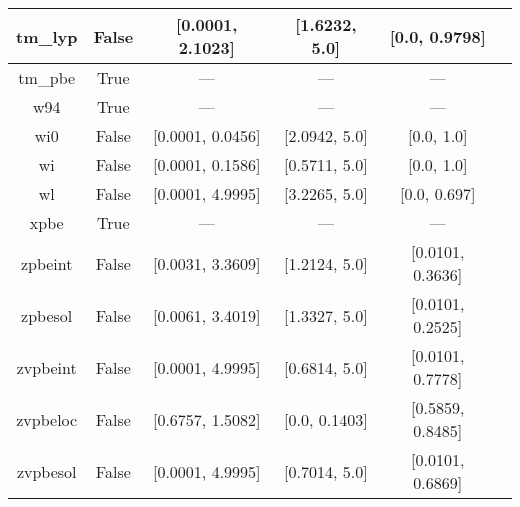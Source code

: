 \begin{tabular}{|c|c|c|c|c|l|}
       tm\_lyp &                 False & [0.0001, 2.1023] &    [1.6232, 5.0] &    [0.0, 0.9798] &                                      \cite{Thakkar2009_134109} \\ \hline
       tm\_pbe &                  True &              --- &              --- &              --- &                                      \cite{Thakkar2009_134109} \\ \hline
           w94 &                  True &              --- &              --- &              --- &                                          \cite{Wilson1994_337} \\ \hline
           wi0 &                 False & [0.0001, 0.0456] &    [2.0942, 5.0] &       [0.0, 1.0] &                                          \cite{Wilson1998_523} \\ \hline
            wi &                 False & [0.0001, 0.1586] &    [0.5711, 5.0] &       [0.0, 1.0] &                                          \cite{Wilson1998_523} \\ \hline
            wl &                 False & [0.0001, 4.9995] &    [3.2265, 5.0] &     [0.0, 0.697] &                                        \cite{Wilson1990_12930} \\ \hline
          xpbe &                  True &              --- &              --- &              --- &                                             \cite{Xu2004_4068} \\ \hline
       zpbeint &                 False & [0.0031, 3.3609] &    [1.2124, 5.0] & [0.0101, 0.3636] &                                   \cite{Constantin2011_233103} \\ \hline
       zpbesol &                 False & [0.0061, 3.4019] &    [1.3327, 5.0] & [0.0101, 0.2525] &                                   \cite{Constantin2011_233103} \\ \hline
      zvpbeint &                 False & [0.0001, 4.9995] &    [0.6814, 5.0] & [0.0101, 0.7778] &                                   \cite{Constantin2012_194105} \\ \hline
      zvpbeloc &                 False & [0.6757, 1.5082] &    [0.0, 0.1403] & [0.5859, 0.8485] &                                         \cite{Fabiano2015_122} \\ \hline
      zvpbesol &                 False & [0.0001, 4.9995] &    [0.7014, 5.0] & [0.0101, 0.6869] &                                   \cite{Constantin2012_194105} \\ \hline
\end{tabular}